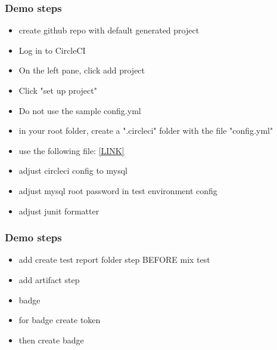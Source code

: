 \begin{frame}
    \frametitle{Demo steps}   
    \begin{itemize}
        \item create github repo with default generated project
        \item Log in to CircleCI
        \item On the left pane, click add project
        \item Click "set up project"
        \item Do not use the sample config.yml
        \item in your root folder, create a ".circleci" folder with the file "config.yml"
        \item use the following file: \href{https://circleci.com/docs/2.0/language-elixir/}{[LINK]}
        \item adjust circleci config to mysql
        \item adjust mysql root password in test environment config
        \item adjust junit formatter
    \end{itemize}
\end{frame}


\begin{frame}
    \frametitle{Demo steps}   
    \begin{itemize}
        \item add create test report folder step BEFORE mix test
        \item add artifact step
        \item badge
        \item for badge create token
        \item then create badge
    \end{itemize}
\end{frame}
